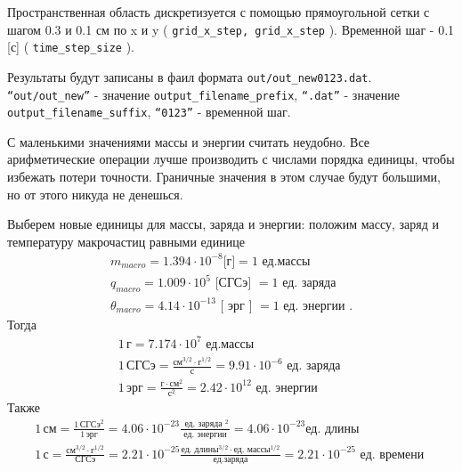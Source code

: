 Пространственная область дискретизуется с помощью прямоугольной сетки с шагом
0.3 и 0.1 см по x и y ( \texttt{grid\_x\_step, grid\_x\_step} ).
Временной шаг - 0.1 [с] ( \texttt{time\_step\_size} ).

Результаты будут записаны в фаил формата \texttt{out/out\_new0123.dat}.
\texttt{``out/out\_new''} - значение \texttt{output\_filename\_prefix},
\texttt{``.dat''} - значение \texttt{output\_filename\_suffix},
\texttt{``0123''} - временной шаг.

С маленькими значениями массы и энергии считать неудобно.
Все арифметические операции лучше производить с числами порядка единицы, чтобы избежать потери точности.
Граничные значения в этом случае будут большими, но от этого никуда не денешься.

Выберем новые единицы для массы, заряда и энергии: положим массу, заряд и температуру макрочастиц равными единице
\begin{gather}
  m_{macro} = 1.394 \cdot 10^{-8} \mbox{[г]} = 1 \mbox{ ед.массы }
  \\
  q_{macro} = 1.009 \cdot 10^{5} \mbox{ [СГСэ] } = 1 \mbox{ ед. заряда }
  \\
  \theta_{macro} = 4.14 \cdot 10^{-13} \mbox{ [ эрг ] } = 1 \mbox{ ед. энергии }.
\end{gather}
Тогда
\begin{gather}
  1 \, \mbox{г} = 7.174 \cdot 10^7 \mbox{ ед.массы }
  \\
  1 \, \mbox{СГСэ} = 
  \frac{ \mbox{см}^{3/2} \cdot \mbox{г}^{1/2} }{ \mbox{с} } = 
  9.91 \cdot 10^{-6} \mbox{ ед. заряда }
  \\
  1 \, \mbox{эрг} = 
  \frac{ \mbox{г} \cdot \mbox{см}^2 }{ \mbox{с}^2 }
  = 2.42 \cdot 10^{12} \mbox{ ед. энергии }
\end{gather}
Также 
\begin{gather}
 1 \, \mbox{см}
 = \frac{ 1 \, \mbox{СГСэ}^2 }{ 1 \, \mbox{эрг} }
 = 4.06 \cdot 10^{-23}  \frac{ \mbox{ ед. заряда }^2 }{ \mbox{ ед. энергии } } 
 = 4.06 \cdot 10^{-23} \mbox{ед. длины}
 \\
 1 \, \mbox{с} 
 = \frac{ \mbox{см}^{3/2} \cdot \mbox{г}^{1/2} }{ \mbox{СГСэ} } 
 = 2.21 \cdot 10^{-25} \frac{ \mbox{ед. длины}^{3/2} \cdot \mbox{ед. массы}^{1/2} }{ \mbox{ед.заряда} } 
 = 2.21 \cdot 10^{-25} \mbox{ ед. времени }
\end{gather}


